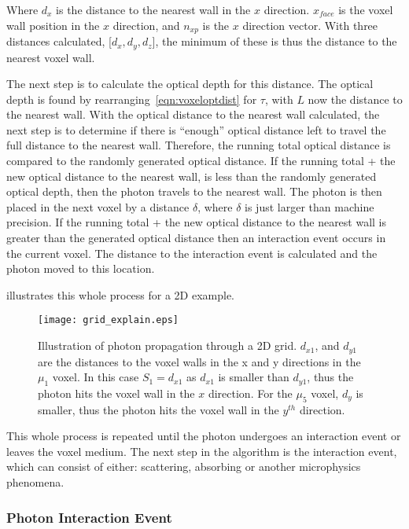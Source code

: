 Where $d_x$ is the distance to the nearest wall in the $x$ direction. $x_{face}$ is the voxel wall position in the $x$ direction, and $n_{xp}$ is the $x$ direction vector.
With three distances calculated, [$d_x, d_y, d_z$], the minimum of these is thus the distance to the nearest voxel wall.

The next step is to calculate the optical depth for this distance.
The optical depth is found by rearranging~\cref{eqn:voxeloptdist} for $\tau$, with $L$ now the distance to the nearest wall.
With the optical distance to the nearest wall calculated, the next step is to determine if there is ``enough'' optical distance left to travel the full distance to the nearest wall.
Therefore, the running total optical distance is compared to the randomly generated optical distance.
If the running total + the new optical distance to the nearest wall, is less than the randomly generated optical depth, then the photon travels to the nearest wall.
The photon is then placed in the next voxel by a distance $\delta$, where $\delta$ is just larger than machine precision.
If the running total + the new optical distance to the nearest wall is greater than the generated optical distance then an interaction event occurs in the current voxel.
The distance to the interaction event is calculated and the photon moved to this location. 

 illustrates this whole process for a 2D example.

\begin{figure}[!htbp]
	\centering
	\texttt{[image: grid\_explain.eps]}
	\caption{Illustration of photon propagation through a 2D grid. $d_{x1}$, and $d_{y1}$ are the distances to the voxel walls in the x and y directions in the $\mu_1$ voxel. In this case $S_1=d_{x1}$ as $d_{x1}$ is smaller than $d_{y1}$, thus the photon hits the voxel wall in the $x$ direction. For the $\mu_5$ voxel, $d_y$ is smaller, thus the photon hits the voxel wall in the $y^{th}$ direction.}
	\label{fig:voxelpropexplain}
\end{figure}

This whole process is repeated until the photon undergoes an interaction event or leaves the voxel medium.
The next step in the algorithm is the interaction event, which can consist of either: scattering, absorbing or another microphysics phenomena. 

\subsubsection*{Photon Interaction Event}\label{sec:photscatterabsorb}

